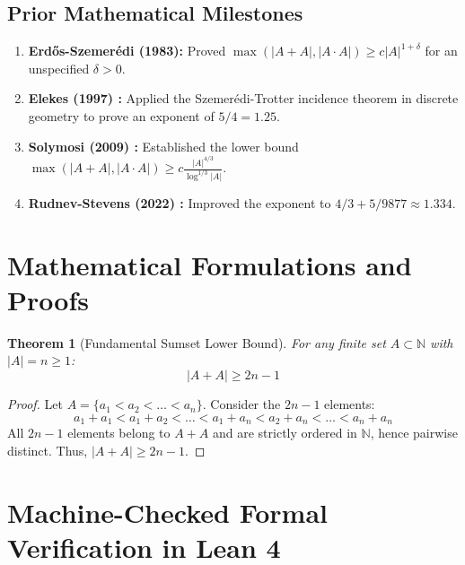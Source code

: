 \documentclass[11pt,a4paper]{article}
\newtheorem{theorem}{Theorem}[section]
\theoremstyle{definition}
\begin{document}
\subsection{Prior Mathematical Milestones}
\begin{enumerate}
    \item \textbf{Erd\H{o}s-Szemer\'edi (1983):} Proved $\max(|A+A|, |A \cdot A|) \ge c |A|^{1 + \delta}$ for an unspecified $\delta > 0$.
    \item \textbf{Elekes (1997) \cite{elekes1997}:} Applied the Szemer\'edi-Trotter incidence theorem in discrete geometry to prove an exponent of $5/4 = 1.25$.
    \item \textbf{Solymosi (2009) \cite{solymosi2009}:} Established the lower bound $\max(|A+A|, |A \cdot A|) \ge c \frac{|A|^{4/3}}{\log^{1/3}|A|}$.
    \item \textbf{Rudnev-Stevens (2022) \cite{rudnev2022}:} Improved the exponent to $4/3 + 5/9877 \approx 1.334$.
\end{enumerate}

\section{Mathematical Formulations and Proofs}

\begin{theorem}[Fundamental Sumset Lower Bound]\label{thm:sumset_bound}
For any finite set $A \subset \mathbb{N}$ with $|A| = n \ge 1$:
\begin{equation}\label{eq:sumset_bound}
|A + A| \ge 2n - 1
\end{equation}
\end{theorem}

\begin{proof}
Let $A = \{a_1 < a_2 < \dots < a_n\}$. Consider the $2n-1$ elements:
\[ a_1 + a_1 < a_1 + a_2 < \dots < a_1 + a_n < a_2 + a_n < \dots < a_n + a_n \]
All $2n-1$ elements belong to $A + A$ and are strictly ordered in $\mathbb{N}$, hence pairwise distinct. Thus, $|A+A| \ge 2n - 1$.
\end{proof}

\section{Machine-Checked Formal Verification in Lean 4}
\end{document}
